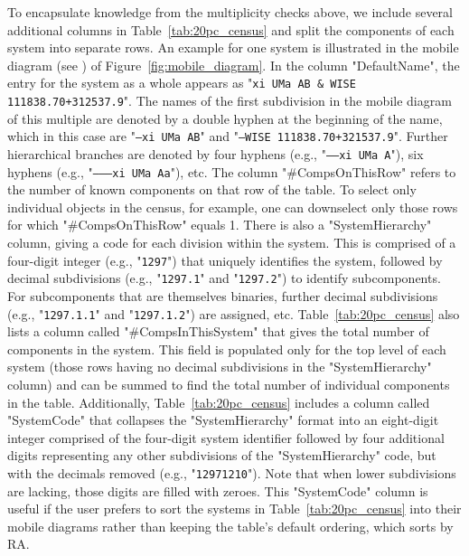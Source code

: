 \documentclass[twocolumn,tighten,twocolappendix]{aastex631}
\begin{document}
To encapsulate knowledge from the multiplicity checks above, we include several additional columns in Table~\ref{tab:20pc_census} and split the components of each system into separate rows. An example for one system is illustrated in the mobile diagram (see \citealt{evans1968}) of Figure~\ref{fig:mobile_diagram}. In the column "DefaultName", the entry for the system as a whole appears as "{\tt xi UMa AB \& WISE 111838.70+312537.9}". The names of the first subdivision in the mobile diagram of this multiple are denoted by a double hyphen at the beginning of the name, which in this case are "{\tt ---xi UMa AB}" and "{\tt ---WISE 111838.70+321537.9}". Further hierarchical branches are denoted by four hyphens (e.g., "{\tt ------xi UMa A}"), six hyphens (e.g., "{\tt ---------xi UMa Aa}"), etc. The column "\#CompsOnThisRow" refers to the number of known components on that row of the table. To select only individual objects in the census, for example, one can downselect only those rows for which "\#CompsOnThisRow" equals 1. There is also a "SystemHierarchy" column, giving a code for each division within the system. This is comprised of a four-digit integer (e.g., "{\tt 1297}") that uniquely identifies the system, followed by decimal subdivisions (e.g., "{\tt 1297.1}" and "{\tt 1297.2}") to identify subcomponents. For subcomponents that are themselves binaries, further decimal subdivisions (e.g., "{\tt 1297.1.1}" and "{\tt 1297.1.2}") are assigned, etc. Table~\ref{tab:20pc_census} also lists a column called "\#CompsInThisSystem" that gives the total number of components in the system. This field is populated only for the top level of each system (those rows having no decimal subdivisions in the "SystemHierarchy" column) and can be summed to find the total number of individual components in the table. Additionally, Table~\ref{tab:20pc_census} includes a column called "SystemCode" that collapses the "SystemHierarchy" format into an eight-digit integer comprised of the four-digit system identifier followed by four additional digits representing any other subdivisions of the "SystemHierarchy" code, but with the decimals removed (e.g., "{\tt 12971210}"). Note that when lower subdivisions are lacking, those digits are filled with zeroes. This "SystemCode" column is useful if the user prefers to sort the systems in Table~\ref{tab:20pc_census} into their mobile diagrams rather than keeping the table's default ordering, which sorts by RA. 
\end{document}
